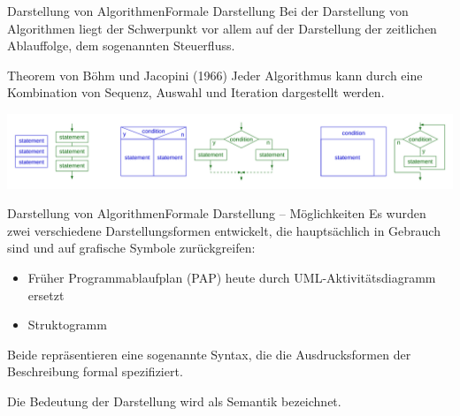 \documentclass[xelatex,aspectratio=169]{beamer}
\begin{document}
\begin{frame}{Darstellung von Algorithmen}{Formale Darstellung}
  Bei der Darstellung von Algorithmen liegt der Schwerpunkt vor allem auf der Darstellung der zeitlichen Ablauffolge, dem sogenannten Steuerfluss.

  \begin{block}{Theorem von Böhm und Jacopini (1966)}
    Jeder Algorithmus kann durch eine Kombination von Sequenz, Auswahl und Iteration dargestellt werden.
  \end{block}

  \includegraphics[width=\textwidth]{img/structured_program_patterns.png}
\end{frame}

\begin{frame}{Darstellung von Algorithmen}{Formale Darstellung -- Möglichkeiten}
  Es wurden zwei verschiedene Darstellungsformen entwickelt, die hauptsächlich in Gebrauch sind und auf grafische Symbole zurückgreifen:

  \begin{itemize}
    \item Früher Programmablaufplan (PAP) \rightarrow heute durch UML-Aktivitätsdiagramm ersetzt
    \item Struktogramm
  \end{itemize}

  Beide repräsentieren eine sogenannte Syntax, die die Ausdrucksformen der Beschreibung formal spezifiziert.

  Die Bedeutung der Darstellung wird als Semantik bezeichnet.
\end{frame}

\end{document}

